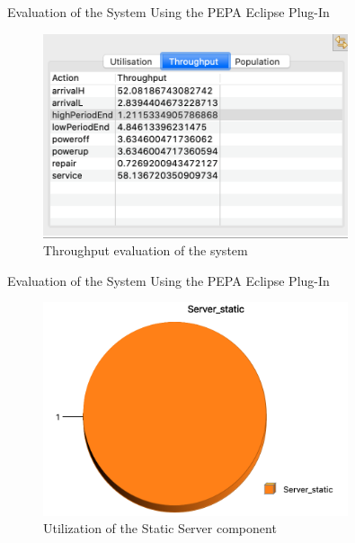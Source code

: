 \documentclass[8pt]{beamer}
\begin{document}
    \begin{frame}{Evaluation of the System Using the PEPA Eclipse Plug-In}
        \begin{figure}[h]
            \centering
            \includegraphics[width=0.8\textwidth]{Images/throughput-plugin.png}
            \caption{Throughput evaluation of the system}
            \label{fig:throughput-plugin}
        \end{figure}
    \end{frame}

    \begin{frame}{Evaluation of the System Using the PEPA Eclipse Plug-In}
        \begin{figure}[h]
            \centering
            \includegraphics[width=0.8\textwidth]{Images/utilization-static-server.png}
            \caption{Utilization of the Static Server component}
            \label{fig:utilization-static-server}
        \end{figure}
    \end{frame}
\end{document}
